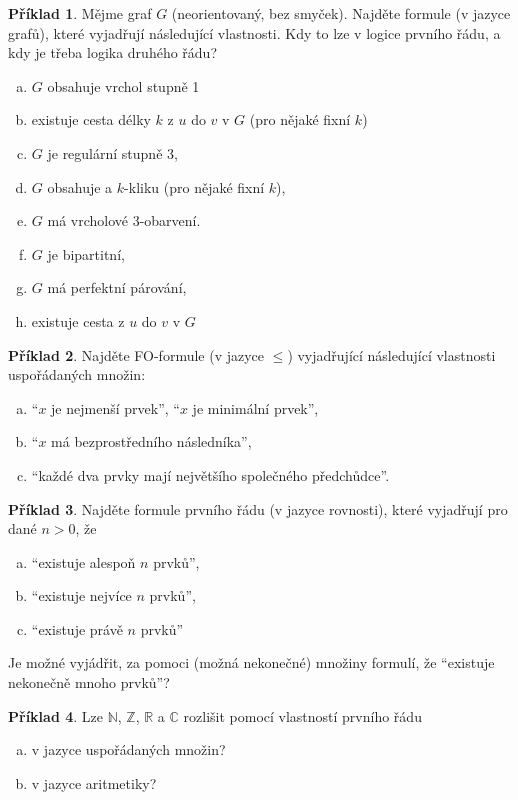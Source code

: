 \documentclass{amsart}
\theoremstyle{definition}
\newtheorem{problem}{Příklad}
\begin{document}
\smallskip
\begin{problem}
Mějme graf $G$ (neorientovaný, bez smyček). Najděte formule (v jazyce grafů), které vyjadřují následující vlastnosti. Kdy to lze v logice prvního řádu, a kdy je třeba logika druhého řádu?
\begin{enumerate}[(a)]
    \item $G$ obsahuje vrchol stupně 1
   \item existuje cesta délky $k$ z $u$ do $v$ v $G$ (pro nějaké fixní $k$)
    \item $G$ je regulární stupně 3,
    \item $G$ obsahuje a $k$-kliku (pro nějaké fixní $k$),
    \item $G$ má vrcholové 3-obarvení.
    \item $G$ je bipartitní,
    \item $G$ má perfektní párování,
    \item existuje cesta z $u$ do $v$ v $G$
\end{enumerate}
\end{problem}


\smallskip
\begin{problem} Najděte FO-formule (v jazyce $\le$) vyjadřující následující vlastnosti uspořádaných množin:
\begin{enumerate}[(a)]
\item ``$x$ je nejmenší prvek'', ``$x$ je minimální prvek'',
\item ``$x$ má bezprostředního následníka'',
\item ``každé dva prvky mají největšího společného předchůdce''.
\end{enumerate}
\end{problem}


\smallskip
\begin{problem} Najděte formule prvního řádu (v jazyce rovnosti), které vyjadřují pro dané $n>0$, že
\begin{enumerate}[(a)]
\item ``existuje alespoň $n$ prvků'',
\item ``existuje nejvíce $n$ prvků'',
\item ``existuje právě  $n$ prvků''
\end{enumerate}
Je možné vyjádřit, za pomoci (možná nekonečné) množiny formulí, že ``existuje nekonečně mnoho prvků''?
\end{problem}

\smallskip
\begin{problem}
Lze $\mathbb N$, $\mathbb Z$, $\mathbb R$ a $\mathbb C$ rozlišit pomocí vlastností prvního řádu
\begin{enumerate}[(a)]
\item v jazyce uspořádaných množin?
\item v jazyce aritmetiky?
\end{enumerate}
\end{problem}
\end{document}
